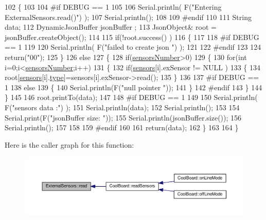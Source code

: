 \begin{DoxyCode}
102 \{
103 
104 \textcolor{preprocessor}{#if DEBUG == 1}
105 
106     Serial.println( F(\textcolor{stringliteral}{"Entering ExternalSensors.read()"}) );
107     Serial.println();
108 
109 \textcolor{preprocessor}{#endif }
110 
111     String data;
112     DynamicJsonBuffer  jsonBuffer ;
113     JsonObject& root = jsonBuffer.createObject();
114 
115     \textcolor{keywordflow}{if}(!root.success() )
116     \{
117  
118 \textcolor{preprocessor}{    #if DEBUG == 1}
119 
120         Serial.println( F(\textcolor{stringliteral}{"failed to create json "}) );
121     
122 \textcolor{preprocessor}{    #endif }
123 
124         \textcolor{keywordflow}{return}(\textcolor{stringliteral}{"00"});
125     \}
126     \textcolor{keywordflow}{else}
127     \{
128         \textcolor{keywordflow}{if}(\hyperlink{class_external_sensors_a58e4fbf9adeae787d92be5fa33043b5d}{sensorsNumber}>0)
129         \{
130             \textcolor{keywordflow}{for}(\textcolor{keywordtype}{int} i=0;i<\hyperlink{class_external_sensors_a58e4fbf9adeae787d92be5fa33043b5d}{sensorsNumber};i++)
131             \{
132                 \textcolor{keywordflow}{if}(\hyperlink{class_external_sensors_a284233f884fcf00154a44740cf1d9e1e}{sensors}[i].exSensor != NULL )
133                 \{
134                     root[\hyperlink{class_external_sensors_a284233f884fcf00154a44740cf1d9e1e}{sensors}[i].\hyperlink{struct_external_sensors_1_1sensor_a6acfdb02c742c2110d7bd2b5d9fce9e7}{type}]=sensors[i].exSensor->read();       
135                 \}
136             
137 \textcolor{preprocessor}{            #if DEBUG == 1}
138                 \textcolor{keywordflow}{else}
139                 \{
140                     Serial.println(F(\textcolor{stringliteral}{"null pointer "}));
141                 \}
142 \textcolor{preprocessor}{            #endif  }
143             \}
144         \}   
145         
146         root.printTo(data);
147     
148 \textcolor{preprocessor}{    #if DEBUG == 1}
149 
150         Serial.println( F(\textcolor{stringliteral}{"sensors data :"}) );
151         Serial.println(data);
152         Serial.println();
153 
154         Serial.print(F(\textcolor{stringliteral}{"jsonBuffer size: "}));
155         Serial.println(jsonBuffer.size());
156         Serial.println();
157 
158     
159 \textcolor{preprocessor}{    #endif}
160     
161         \textcolor{keywordflow}{return}(data);
162     \}
163 
164 \}
\end{DoxyCode}
Here is the caller graph for this function\+:\nopagebreak
\begin{figure}[H]
\begin{center}
\leavevmode
\includegraphics[width=350pt]{d1/d2f/class_external_sensors_a53177b81eca3be89508b5511ddcd00fc_icgraph}
\end{center}
\end{figure}


